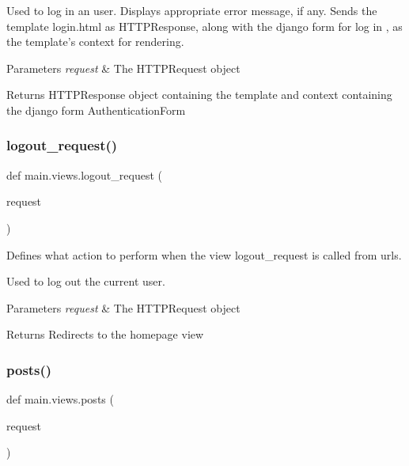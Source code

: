 Used to log in an user. Displays appropriate error message, if any. Sends the template login.\+html as H\+T\+T\+P\+Response, along with the django form for log in , as the template’s context for rendering. 
\begin{DoxyParams}{Parameters}
{\em request} & The H\+T\+T\+P\+Request object \\
\hline
\end{DoxyParams}
\begin{DoxyReturn}{Returns}
H\+T\+T\+P\+Response object containing the template and context containing the django form Authentication\+Form 
\end{DoxyReturn}
\mbox{\label{namespacemain_1_1views_a19ef1e1ff8dc4a8b7f24c011a69c56f5}} 
\subsubsection{\texorpdfstring{logout\+\_\+request()}{logout\_request()}}
{\footnotesize\ttfamily def main.\+views.\+logout\+\_\+request (\begin{DoxyParamCaption}\item[{}]{request }\end{DoxyParamCaption})}



Defines what action to perform when the view \textquotesingle{}logout\+\_\+request\textquotesingle{} is called from urls. 

Used to log out the current user. 
\begin{DoxyParams}{Parameters}
{\em request} & The H\+T\+T\+P\+Request object \\
\hline
\end{DoxyParams}
\begin{DoxyReturn}{Returns}
Redirects to the homepage view 
\end{DoxyReturn}
\mbox{\label{namespacemain_1_1views_a33ddb0f904d196b5830dbb9a1a8f1282}} 
\subsubsection{\texorpdfstring{posts()}{posts()}}
{\footnotesize\ttfamily def main.\+views.\+posts (\begin{DoxyParamCaption}\item[{}]{request }\end{DoxyParamCaption})}



